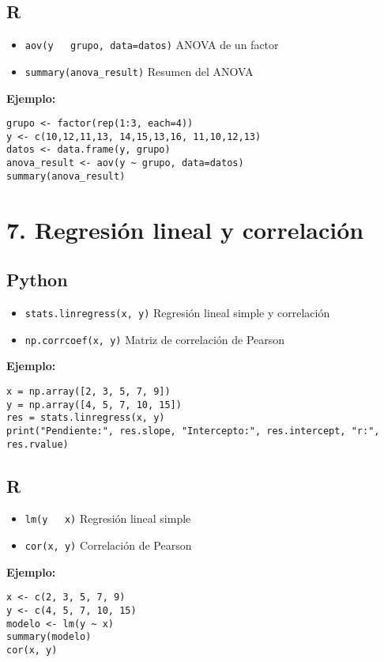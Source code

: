 \subsection*{R}
\begin{itemize}
    \item \texttt{aov(y ~ grupo, data=datos)} \hfill ANOVA de un factor
    \item \texttt{summary(anova\_result)} \hfill Resumen del ANOVA
\end{itemize}

\textbf{Ejemplo:}
\begin{verbatim}
grupo <- factor(rep(1:3, each=4))
y <- c(10,12,11,13, 14,15,13,16, 11,10,12,13)
datos <- data.frame(y, grupo)
anova_result <- aov(y ~ grupo, data=datos)
summary(anova_result)
\end{verbatim}

\section*{7. Regresión lineal y correlación}

\subsection*{Python}
\begin{itemize}
    \item \texttt{stats.linregress(x, y)} \hfill Regresión lineal simple y correlación
    \item \texttt{np.corrcoef(x, y)} \hfill Matriz de correlación de Pearson
\end{itemize}

\textbf{Ejemplo:}
\begin{verbatim}
x = np.array([2, 3, 5, 7, 9])
y = np.array([4, 5, 7, 10, 15])
res = stats.linregress(x, y)
print("Pendiente:", res.slope, "Intercepto:", res.intercept, "r:", res.rvalue)
\end{verbatim}

\subsection*{R}
\begin{itemize}
    \item \texttt{lm(y ~ x)} \hfill Regresión lineal simple
    \item \texttt{cor(x, y)} \hfill Correlación de Pearson
\end{itemize}

\textbf{Ejemplo:}
\begin{verbatim}
x <- c(2, 3, 5, 7, 9)
y <- c(4, 5, 7, 10, 15)
modelo <- lm(y ~ x)
summary(modelo)
cor(x, y)
\end{verbatim}

